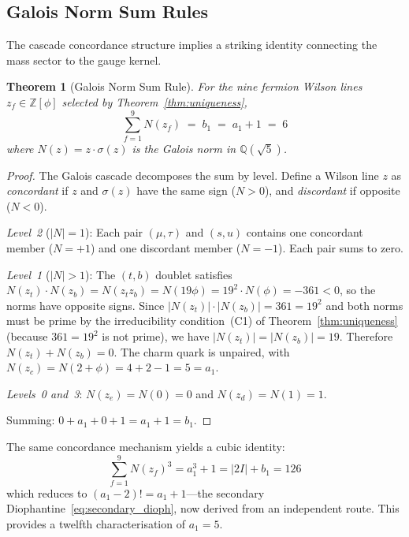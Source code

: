 \documentclass[12pt,a4paper]{article}
\newtheorem{theorem}{Theorem}
\theoremstyle{definition}
\begin{document}
\subsection{Galois Norm Sum Rules}
\label{sec:norm_sum}

The cascade concordance structure implies a striking identity connecting the mass sector to the gauge kernel.

\begin{theorem}[Galois Norm Sum Rule]\label{thm:norm_sum}
For the nine fermion Wilson lines $z_f \in \mathbb{Z}[\phi]$ selected by Theorem~\ref{thm:uniqueness},
\begin{equation}
\boxed{\sum_{f=1}^{9} N(z_f) \;=\; b_1 \;=\; a_1 + 1 \;=\; 6}
\label{eq:norm_sum}
\end{equation}
where $N(z) = z \cdot \sigma(z)$ is the Galois norm in $\mathbb{Q}(\sqrt{5})$.
\end{theorem}

\begin{proof}
The Galois cascade decomposes the sum by level.  Define a Wilson line $z$ as \emph{concordant} if $z$ and $\sigma(z)$ have the same sign ($N > 0$), and \emph{discordant} if opposite ($N < 0$).

\emph{Level~2} ($|N| = 1$): Each pair $(\mu, \tau)$ and $(s, u)$ contains one concordant member ($N = +1$) and one discordant member ($N = -1$).  Each pair sums to zero.

\emph{Level~1} ($|N| > 1$): The $(t, b)$ doublet satisfies $N(z_t) \cdot N(z_b) = N(z_t z_b) = N(19\phi) = 19^2 \cdot N(\phi) = -361 < 0$, so the norms have opposite signs.  Since $|N(z_t)| \cdot |N(z_b)| = 361 = 19^2$ and both norms must be prime by the irreducibility condition~(C1) of Theorem~\ref{thm:uniqueness} (because $361 = 19^2$ is not prime), we have $|N(z_t)| = |N(z_b)| = 19$.  Therefore $N(z_t) + N(z_b) = 0$.  The charm quark is unpaired, with $N(z_c) = N(2 + \phi) = 4 + 2 - 1 = 5 = a_1$.

\emph{Levels~0 and~3}: $N(z_e) = N(0) = 0$ and $N(z_d) = N(1) = 1$.

Summing: $0 + a_1 + 0 + 1 = a_1 + 1 = b_1$.
\end{proof}

\noindent The same concordance mechanism yields a cubic identity:
\begin{equation}
\sum_{f=1}^{9} N(z_f)^3 = a_1^3 + 1 = |2I| + b_1 = 126
\label{eq:cubic_norm}
\end{equation}
which reduces to $(a_1 - 2)! = a_1 + 1$---the secondary Diophantine~\eqref{eq:secondary_dioph}, now derived from an independent route.  This provides a twelfth characterisation of $a_1 = 5$.
\end{document}
